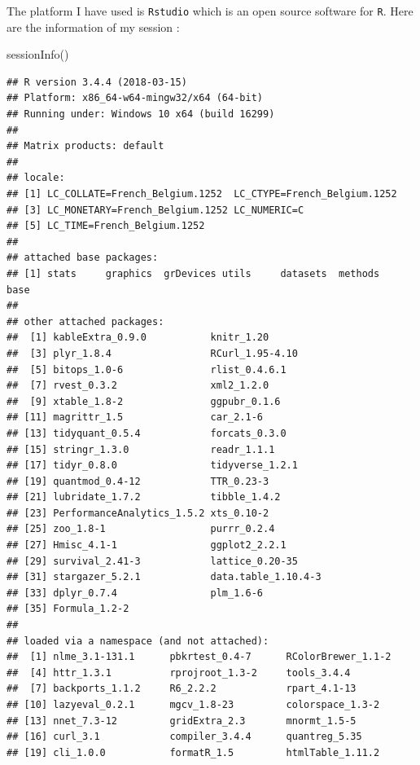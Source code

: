 \documentclass[12pt,]{article}
\newenvironment{Shaded}{}{}
\newcommand{\KeywordTok}[1]{\textcolor[rgb]{0.00,0.00,1.00}{#1}}
\newcommand{\NormalTok}[1]{#1}
\begin{document}
The platform I have used is \texttt{Rstudio} which is an open source
software for \texttt{R}. Here are the information of my session :

\begin{Shaded}
\begin{Highlighting}[]
\KeywordTok{sessionInfo}\NormalTok{()}
\end{Highlighting}
\end{Shaded}

\begin{verbatim}
## R version 3.4.4 (2018-03-15)
## Platform: x86_64-w64-mingw32/x64 (64-bit)
## Running under: Windows 10 x64 (build 16299)
## 
## Matrix products: default
## 
## locale:
## [1] LC_COLLATE=French_Belgium.1252  LC_CTYPE=French_Belgium.1252   
## [3] LC_MONETARY=French_Belgium.1252 LC_NUMERIC=C                   
## [5] LC_TIME=French_Belgium.1252    
## 
## attached base packages:
## [1] stats     graphics  grDevices utils     datasets  methods   base     
## 
## other attached packages:
##  [1] kableExtra_0.9.0           knitr_1.20                
##  [3] plyr_1.8.4                 RCurl_1.95-4.10           
##  [5] bitops_1.0-6               rlist_0.4.6.1             
##  [7] rvest_0.3.2                xml2_1.2.0                
##  [9] xtable_1.8-2               ggpubr_0.1.6              
## [11] magrittr_1.5               car_2.1-6                 
## [13] tidyquant_0.5.4            forcats_0.3.0             
## [15] stringr_1.3.0              readr_1.1.1               
## [17] tidyr_0.8.0                tidyverse_1.2.1           
## [19] quantmod_0.4-12            TTR_0.23-3                
## [21] lubridate_1.7.2            tibble_1.4.2              
## [23] PerformanceAnalytics_1.5.2 xts_0.10-2                
## [25] zoo_1.8-1                  purrr_0.2.4               
## [27] Hmisc_4.1-1                ggplot2_2.2.1             
## [29] survival_2.41-3            lattice_0.20-35           
## [31] stargazer_5.2.1            data.table_1.10.4-3       
## [33] dplyr_0.7.4                plm_1.6-6                 
## [35] Formula_1.2-2             
## 
## loaded via a namespace (and not attached):
##  [1] nlme_3.1-131.1      pbkrtest_0.4-7      RColorBrewer_1.1-2 
##  [4] httr_1.3.1          rprojroot_1.3-2     tools_3.4.4        
##  [7] backports_1.1.2     R6_2.2.2            rpart_4.1-13       
## [10] lazyeval_0.2.1      mgcv_1.8-23         colorspace_1.3-2   
## [13] nnet_7.3-12         gridExtra_2.3       mnormt_1.5-5       
## [16] curl_3.1            compiler_3.4.4      quantreg_5.35      
## [19] cli_1.0.0           formatR_1.5         htmlTable_1.11.2   

\end{verbatim}
\end{document}
